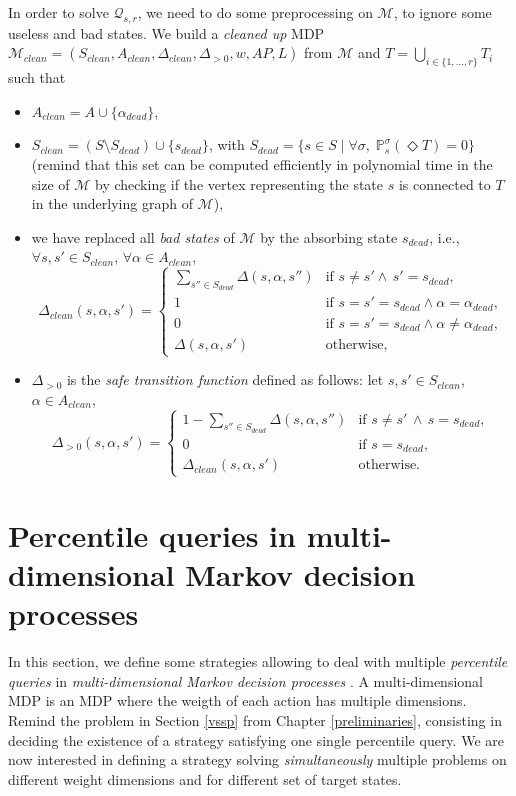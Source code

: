 In order to solve $\mathcal{Q}_{s, r}$, we need to do some preprocessing on $\mathcal{M}$, to ignore some useless and bad states.
We build a \textit{cleaned up} MDP \sloppy $\mathcal{M}_{clean} = (S_{clean}, A_{clean}, \Delta_{clean}, \Delta_{>0}, w, AP, L)$ from $\mathcal{M}$ and $T = \bigcup_{i \in \{1, \dots, r\}} T_i$ such that
\begin{itemize}
  \item $A_{clean} = A \cup \{\alpha_{dead}\}$,
  \item $S_{clean} = (S \setminus S_{dead}) \cup \{s_{dead}\}$, with
  $S_{dead} = \{s \in S \; | \; \forall \sigma, \; \mathbb{P}_s^\sigma(\Diamond T) = 0\}$
  (remind that this set can be computed efficiently in polynomial time in the size of $\mathcal{M}$ by checking if the vertex representing the state $s$ is connected to $T$ in the underlying graph of $\mathcal{M}$),
  \item we have replaced all \textit{bad states} of $\mathcal{M}$ by the absorbing state $s_{dead}$, i.e., $\forall s, s' \in S_{clean}, \, \forall \alpha \in A_{clean}$, \,
  \[
    \Delta_{clean}(s, \alpha, s') = \begin{cases}
      \sum_{s'' \in S_{dead}} \Delta(s, \alpha, s'') & \text{if } s \neq s' \wedge \, s' = s_{dead}, \\
      1 & \text{if } s=s'=s_{dead} \wedge  \alpha = \alpha_{dead},\\
      0 & \text{if } s=s'=s_{dead} \wedge  \alpha \neq \alpha_{dead}, \\
      \Delta(s, \alpha, s') & \text{otherwise},
    \end{cases}
  \]
  \item $\Delta_{>0}$ is the \textit{safe transition function} defined as follows: let $s, s' \in S_{clean}$, $\alpha \in A_{clean}$,
  \[
    \Delta_{>0}(s, \alpha, s') = \begin{cases}
      1 - \sum_{s'' \in S_{dead}} \Delta(s, \alpha, s'') & \text{if } s \neq s'\, \wedge \, s = s_{dead}, \\
      0 &\text{if } s=s_{dead}, \\
      \Delta_{clean}(s, \alpha, s') &\text{otherwise.}
    \end{cases}
  \]
\end{itemize}

\section{Percentile queries in multi-dimensional Markov decision processes}
In this section, we define some strategies allowing to deal with multiple \textit{percentile queries} in \textit{multi-dimensional Markov decision processes} \cite{DBLP:journals/fmsd/RandourRS17}.
A multi-dimensional MDP is an MDP where the weigth of each action has multiple dimensions.
Remind the \SSPP{} problem in Section \ref{vssp} from Chapter \ref{preliminaries}, consisting in deciding the existence of a strategy satisfying one single percentile query.
We are now interested in defining a strategy solving \textit{simultaneously} multiple \SSPP{} problems on different weight dimensions and for different set of target states.

